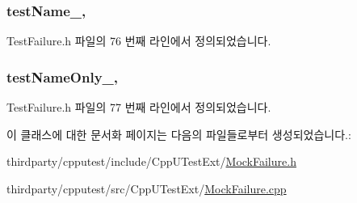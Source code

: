 \subsubsection[{\texorpdfstring{test\+Name\+\_\+}{testName_}}]{ test\+Name\+\_\+\hspace{0.3cm}{\ttfamily [protected]}, {\ttfamily [inherited]}}\hypertarget{class_test_failure_afb42d7601608c3597c5279ddaf87e9d6}{}\label{class_test_failure_afb42d7601608c3597c5279ddaf87e9d6}


Test\+Failure.\+h 파일의 76 번째 라인에서 정의되었습니다.

\subsubsection[{\texorpdfstring{test\+Name\+Only\+\_\+}{testNameOnly_}}]{ test\+Name\+Only\+\_\+\hspace{0.3cm}{\ttfamily [protected]}, {\ttfamily [inherited]}}\hypertarget{class_test_failure_a60a0b2466b44483497e83d73b70241f2}{}\label{class_test_failure_a60a0b2466b44483497e83d73b70241f2}


Test\+Failure.\+h 파일의 77 번째 라인에서 정의되었습니다.



이 클래스에 대한 문서화 페이지는 다음의 파일들로부터 생성되었습니다.\+:\begin{DoxyCompactItemize}
\item 
thirdparty/cpputest/include/\+Cpp\+U\+Test\+Ext/\hyperlink{_mock_failure_8h}{Mock\+Failure.\+h}\item 
thirdparty/cpputest/src/\+Cpp\+U\+Test\+Ext/\hyperlink{_mock_failure_8cpp}{Mock\+Failure.\+cpp}\end{DoxyCompactItemize}
